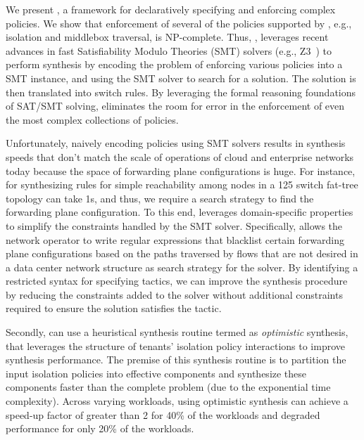 We present \Name, a framework for declaratively specifying and
enforcing complex policies.  We show that enforcement of several of
the policies supported by \Name, e.g., isolation and middlebox
traversal, is NP-complete. Thus, \Name, leverages recent advances in
fast Satisfiability Modulo Theories (SMT) solvers (e.g., Z3~\cite{z3})
to perform synthesis by encoding the problem of enforcing various
policies into a SMT instance, and using the SMT solver to search for a
solution. The solution is then translated into switch rules. %
By leveraging the formal reasoning foundations of SAT/SMT solving,
\Name eliminates the room for error in the enforcement of even the
most complex collections of policies.

Unfortunately, naively encoding policies using SMT solvers results in
synthesis speeds that don't match the scale of operations of cloud and
enterprise networks today because the space of forwarding plane configurations
is huge. For instance, for synthesizing rules for simple
reachability among nodes in a 125 switch fat-tree topology can take
1s, and thus, we require a search strategy to find the forwarding plane
configuration.  To this
end, \Name leverages domain-specific properties to simplify the
constraints handled by the SMT solver.  Specifically, \Name allows the
network operator to write regular expressions that blacklist certain
forwarding plane configurations based on the paths traversed by flows  
that are not desired in a data center network structure as
search strategy for the solver. 
By identifying a restricted syntax for specifying
tactics, we can improve the synthesis procedure by reducing the
constraints added to the solver without additional constraints
required to ensure the solution satisfies the tactic. 

 Secondly, \Name can use a heuristical synthesis routine termed as
 \emph{optimistic} synthesis, that leverages the structure of tenants'
 isolation policy interactions to improve synthesis performance. The
 premise of this synthesis routine is to partition the input isolation
 policies into effective components and synthesize these components
 faster than the complete problem (due to the exponential time
 complexity). Across varying workloads, using optimistic synthesis can
 achieve a speed-up factor of greater than 2 for 40\% of the workloads
 and degraded performance for only 20\% of the workloads.   

